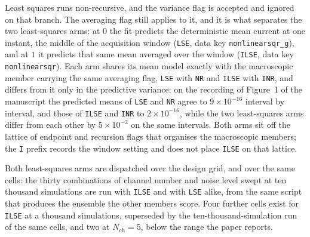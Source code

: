 \documentclass[11pt]{article}
\begin{document}
Least squares runs non-recursive, and the variance flag is accepted and ignored on that branch. The
averaging flag still applies to it, and it is what separates the two least-squares arms: at $0$ the
fit predicts the deterministic mean current at one instant, the middle of the acquisition window
(\texttt{LSE}, data key \texttt{nonlinearsqr\_g}), and at $1$ it predicts that same mean averaged
over the window (\texttt{ILSE}, data key \texttt{nonlinearsqr}).
Each arm shares its mean model exactly with the macroscopic member carrying the same averaging
flag, \texttt{LSE} with \texttt{NR} and \texttt{ILSE} with \texttt{INR}, and differs from it only in
the predictive variance: on the recording of Figure~1 of the manuscript the predicted means of
\texttt{LSE} and \texttt{NR} agree to $9\times10^{-16}$ interval by interval, and those of
\texttt{ILSE} and \texttt{INR} to $2\times10^{-16}$, while the two least-squares arms differ from
each other by $5\times10^{-2}$ on the same intervals. Both arms sit off the lattice of endpoint and
recursion flags that organises the macroscopic members; the \texttt{I} prefix records the window
setting and does not place \texttt{ILSE} on that lattice.

Both least-squares arms are dispatched over the design grid, and over the same cells: the thirty
combinations of channel number and noise level swept at ten thousand simulations are run with
\texttt{ILSE} and with \texttt{LSE} alike, from the same script that produces the ensemble the other
members score. Four further cells exist for \texttt{ILSE} at a thousand simulations, superseded by
the ten-thousand-simulation run of the same cells, and two at $N_{\mathrm{ch}}=5$, below the range
the paper reports.
\end{document}
